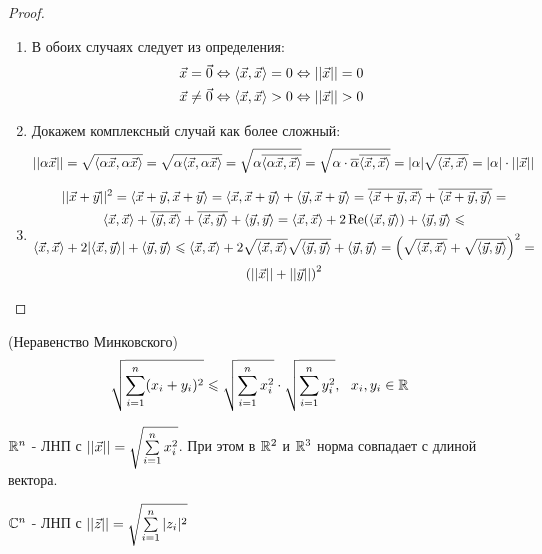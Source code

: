 \begin{proof}~
	\begin{enumerate}
		\item В обоих случаях следует из определения:
		\begin{align*}
			\vec{x} = \vec{0} \Leftrightarrow \langle\vec{x}, \vec{x}\rangle = 0 \Leftrightarrow ||\vec{x}|| = 0
			\\
			\vec{x} \neq \vec{0} \Leftrightarrow \langle\vec{x}, \vec{x}\rangle > 0 \Leftrightarrow ||\vec{x}|| > 0
		\end{align*}
		
		\item Докажем комплексный случай как более сложный:
		\[
			||\alpha\vec{x}|| = \sqrt{\langle\alpha\vec{x}, \alpha\vec{x}\rangle} = \sqrt{\alpha\langle\vec{x}, \alpha\vec{x}\rangle} = \sqrt{\alpha\overline{\langle\alpha\vec{x}, \vec{x}\rangle}} = \sqrt{\alpha \cdot \overline{\alpha}\overline{\langle\vec{x}, \vec{x}\rangle}} = |\alpha|\sqrt{\langle\vec{x}, \vec{x}\rangle} = |\alpha| \cdot ||\vec{x}||
		\]
		
		\item
		\begin{multline*}
			||\vec{x} + \vec{y}||^2 = \langle\vec{x} + \vec{y}, \vec{x} + \vec{y}\rangle = \langle\vec{x}, \vec{x} + \vec{y}\rangle + \langle\vec{y}, \vec{x} + \vec{y}\rangle = \overline{\langle\vec{x} + \vec{y}, \vec{x}\rangle} + \overline{\langle\vec{x} + \vec{y}, \vec{y}\rangle} =
			\\
			\langle\vec{x}, \vec{x}\rangle + \overline{\langle\vec{y}, \vec{x}\rangle} + \overline{\langle\vec{x}, \vec{y}\rangle} + \langle\vec{y}, \vec{y}\rangle = \langle\vec{x}, \vec{x}\rangle + 2\operatorname{Re}(\langle\vec{x}, \vec{y}\rangle) + \langle\vec{y}, \vec{y}\rangle \leqslant
			\\
			\langle\vec{x}, \vec{x}\rangle + 2 |\langle\vec{x}, \vec{y}\rangle| + \langle\vec{y}, \vec{y}\rangle \leqslant \langle\vec{x}, \vec{x}\rangle + 2 \sqrt{\langle\vec{x}, \vec{x}\rangle} \sqrt{\langle\vec{y}, \vec{y}\rangle} + \langle\vec{y}, \vec{y}\rangle = \left(\sqrt{\langle\vec{x}, \vec{x}\rangle} + \sqrt{\langle\vec{y}, \vec{y}\rangle}\right)^2 =
			\\
			\left(||\vec{x}|| + ||\vec{y}||\right)^2
		\end{multline*}
	\end{enumerate}
\end{proof}

\begin{corollary} (Неравенство Минковского)
	\[
		\sqrt{\sum\limits_{i = 1}^n (x_i + y_i)^2} \leqslant \sqrt{\sum\limits_{i = 1}^n x_i^2} \cdot \sqrt{\sum\limits_{i = 1}^n y_i^2},\ \ x_i, y_i \in \mathbb{R} 
	\]
\end{corollary}

\begin{lemma}
	$\mathbb{R}^n$ - ЛНП с $||\vec{x}|| = \sqrt{\sum\limits_{i = 1}^n x_i^2}$. При этом в $\mathbb{R}^2$ и $\mathbb{R}^3$ норма совпадает с длиной вектора.
\end{lemma}

\begin{lemma}
	$\mathbb{C}^n$ - ЛНП с $||\vec{z}|| = \sqrt{\sum\limits_{i = 1}^n |z_i|^2}$
\end{lemma}
